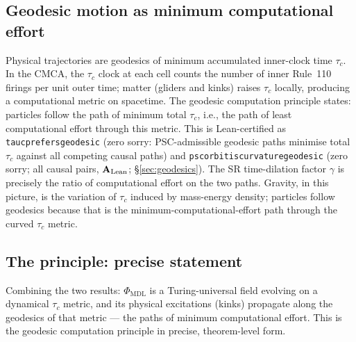 \documentclass[11pt]{article}
\theoremstyle{remark}
\newcommand{\PHIMDL}{\Phi_{\mathrm{MDL}}}
\newcommand{\lean}[1]{%
  \penalty-100
  \begingroup\def\_{\textunderscore\allowbreak}\texttt{#1}\endgroup}
\newcommand{\CatAL}{\ensuremath{\textbf{A}_{\rm Lean}}}
\begin{document}
\subsection{Geodesic motion as minimum computational effort}

Physical trajectories are geodesics of minimum accumulated inner-clock time
$\tau_c$.  In the CMCA, the $\tau_c$ clock at each cell counts the number of
inner Rule~110 firings per unit outer time; matter (gliders and kinks) raises
$\tau_c$ locally, producing a computational metric on spacetime.  The geodesic
computation principle states: particles follow the path of minimum total
$\tau_c$, i.e., the path of least computational effort through this metric.
This is Lean-certified as \lean{tau\_c\_prefers\_geodesic} (zero sorry:
PSC-admissible geodesic paths minimise total $\tau_c$ against all competing
causal paths) and \lean{psc\_orbit\_is\_curvature\_geodesic} (zero sorry;
all causal pairs, $\CatAL$; \S\ref{sec:geodesics}).
The SR time-dilation factor $\gamma$ is precisely the ratio of computational
effort on the two paths.  Gravity, in this picture, is the variation of
$\tau_c$ induced by mass-energy density; particles follow geodesics because
that is the minimum-computational-effort path through the curved $\tau_c$ metric.

\subsection{The principle: precise statement}

Combining the two results: $\PHIMDL$ is a Turing-universal field evolving
on a dynamical $\tau_c$ metric, and its physical excitations (kinks) propagate
along the geodesics of that metric --- the paths of minimum computational effort.
This is the geodesic computation principle in precise, theorem-level form.
\end{document}
